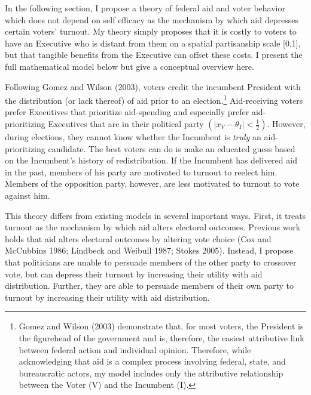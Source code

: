 \documentclass[12pt]{paper}
\begin{document}
In the following section, I propose a theory of federal aid and voter behavior which does not depend on self efficacy as the mechanism by which aid depresses certain voters' turnout. My theory simply proposes that it is costly to voters to have an Executive who is distant from them on a spatial partisanship scale [0,1], but that tangible benefits from the Executive can offset these costs. I present the full mathematical model below but give a conceptual overview here. 

Following Gomez and Wilson (2003), voters credit the incumbent President with the distribution (or lack thereof) of aid prior to an election.\footnote{Gomez and Wilson (2003) demonstrate that, for most voters, the President is the figurehead of the government and is, therefore, the easiest attributive link between federal action and individual opinion. Therefore, while acknowledging that aid is a complex process involving federal, state, and bureaucratic actors, my model includes only the attributive relationship between the Voter (V) and the Incumbent (I).} Aid-receiving voters prefer Executives that prioritize aid-spending and especially prefer aid-prioritizing Executives that are in their political party $(|x_V - \theta_I| < \frac{1}{2})$. However, during elections, they cannot know whether the Incumbent is \textit{truly} an aid-prioritizing candidate. The best voters can do is make an educated guess based on the Incumbent's history of redistribution. If the Incumbent has delivered aid in the past, members of his party are motivated to turnout to reelect him. Members of the opposition party, however, are less motivated to turnout to vote against him.

This theory differs from existing models in several important ways. First, it treats turnout as the mechanism by which aid alters electoral outcomes. Previous work holds that aid alters electoral outcomes by altering vote choice (Cox and McCubbins 1986; Lindbeck and Weibull 1987; Stokes 2005). Instead, I propose that politicians are unable to persuade members of the other party to crossover vote, but can depress their turnout by increasing their utility with aid distribution. Further, they are able to persuade members of their own party to turnout by increasing their utility with aid distribution. 
\end{document}
